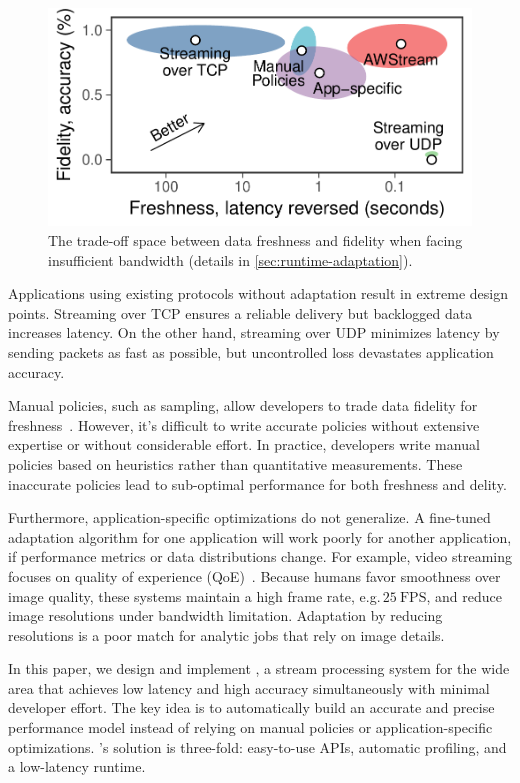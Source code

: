 \begin{figure}
  \centering
  \includegraphics[width=0.8\columnwidth]{figures/figure1.pdf}
  \caption{The trade-off space between data freshness and fidelity when facing
    insufficient bandwidth (details in \autoref{sec:runtime-adaptation}).}
  \label{fig:intro}
  \vspace{-1em}
\end{figure}

Applications using existing protocols without adaptation result in extreme
design points. Streaming over TCP ensures a reliable delivery but backlogged
data increases latency. On the other hand, streaming over UDP minimizes latency
by sending packets as fast as possible, but uncontrolled loss devastates
application accuracy.

Manual policies, such as sampling, allow developers to trade data fidelity for
freshness~\cite{rabkin2014aggregation}. However, it's difficult to write
accurate policies without extensive expertise or without considerable effort. In
practice, developers write manual policies based on heuristics rather than
quantitative measurements. These inaccurate policies lead to sub-optimal
performance for both freshness and delity.

Furthermore, application-specific optimizations do not generalize. A fine-tuned
adaptation algorithm for one application will work poorly for another
application, if performance metrics or data distributions change.  For example,
video streaming focuses on quality of experience
(QoE)~\cite{michalos2012dynamic, pantos2016http, yin2015control}. Because humans
favor smoothness over image quality, these systems maintain a high frame rate,
e.g.\,\(25~\text{FPS}\), and reduce image resolutions under bandwidth
limitation.  Adaptation by reducing resolutions is a poor match for analytic
jobs that rely on image details.

In this paper, we design and implement \sysname{}, a stream processing system
for the wide area that achieves low latency and high accuracy simultaneously
with minimal developer effort. The key idea is to automatically build an
accurate and precise performance model instead of relying on manual policies or
application-specific optimizations. \sysname{}'s solution is three-fold:
easy-to-use APIs, automatic profiling, and a low-latency runtime.

